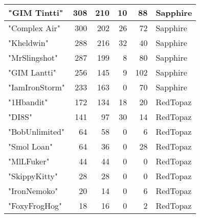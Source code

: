 \documentclass{article}
\begin{document}
\begin{table}[htbp]
\begin{tabular}{|l|r|r|r|r|l|}
"GIM Tintti" & 308 & 210 & 10 & 88 & Sapphire \\ \hline
"Complex Air" & 300 & 202 & 26 & 72 & Sapphire \\ \hline
"Kheldwin" & 288 & 216 & 32 & 40 & Sapphire \\ \hline
"MrSlingshot" & 287 & 199 & 8 & 80 & Sapphire \\ \hline
"GIM Lantti" & 256 & 145 & 9 & 102 & Sapphire \\ \hline
"IamIronStorm" & 233 & 163 & 0 & 70 & Sapphire \\ \hline
"1Hbandit" & 172 & 134 & 18 & 20 & RedTopaz \\ \hline
"DI8S" & 141 & 97 & 30 & 14 & RedTopaz \\ \hline
"BobUnlimited" & 64 & 58 & 0 & 6 & RedTopaz \\ \hline
"Smol Loan" & 64 & 36 & 0 & 28 & RedTopaz \\ \hline
"MlLFuker" & 44 & 44 & 0 & 0 & RedTopaz \\ \hline
"SkippyKitty" & 28 & 28 & 0 & 0 & RedTopaz \\ \hline
"IronNemoko" & 20 & 14 & 0 & 6 & RedTopaz \\ \hline
"FoxyFrogHog" & 18 & 16 & 0 & 2 & RedTopaz \\ \hline
\end{tabular}
\end{table}
\end{document}
